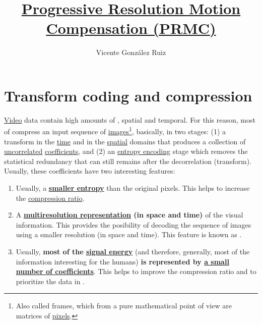 
\title{\href{https://github.com/Sistemas-Multimedia/PRMC}{Progressive Resolution Motion Compensation (PRMC)}}

\author{Vicente González Ruiz}


\maketitle

\tableofcontents

\section{Transform coding and compression}

\href{https://en.wikipedia.org/wiki/Video}{Video} data contain high
amounts of , spatial and temporal. For
this reason, most of 
compress an input sequence of
\href{https://en.wikipedia.org/wiki/Digital_image}{images}\footnote{Also
  called frames, which from a pure mathematical point of view are
  matrices of \href{https://en.wikipedia.org/wiki/Pixel}{pixels}.},
basically, in two stages: (1) a transform in the
\href{https://en.wikipedia.org/wiki/Time_domain}{time} and in the
\href{https://www.quora.com/What-is-spatial-domain-in-image-processing}{spatial}
domains that produces a collection of
\href{https://en.wikipedia.org/wiki/Decorrelation}{uncorrelated}
\href{https://en.wikipedia.org/wiki/Discrete_wavelet_transform}{coefficients},
and (2) an
\href{https://en.wikipedia.org/wiki/Entropy_encoding}{entropy
  encoding} stage which removes the statistical redundancy that can
still remains after the decorrelation (transform). Usually, these
coefficients have two interesting features:
\begin{enumerate}
\item Usually, a \textbf{
  \href{https://vicente-gonzalez-ruiz.github.io/symbol_compression/}{smaller
  entropy}} than the original pixels. This helps to increase
  the \href{https://en.wikipedia.org/wiki/Data_compression_ratio}{compression
    ratio}.
\item A
  \textbf{\href{https://en.wikipedia.org/wiki/Image_resolution}{multiresolution
      representation} (in space and time)} of the visual
  information. This provides the posibility of decoding the sequence
  of images using a smaller resolution (in space and time). This
  feature is known as .
\item Usually, \textbf{most of the
  \href{https://en.wikipedia.org/wiki/Energy_(signal_processing)}{signal
    energy}} (and therefore, generally, most of the information
  interesting for the humans) \textbf{is represented by
    \href{https://vicente-gonzalez-ruiz.github.io/image_transformations_for_coding}{a
      small number of coefficients}}. This helps to improve the
  compression ratio and to prioritize the data in
  .
\end{enumerate}

